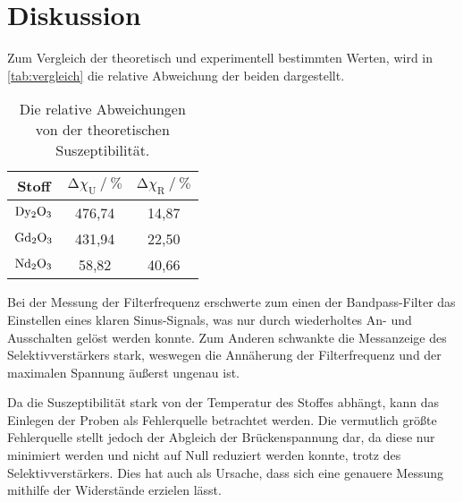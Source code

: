 \section{Diskussion}
\label{sec:Diskussion}

Zum Vergleich der theoretisch und experimentell bestimmten Werten, 
wird in \autoref{tab:vergleich} die relative Abweichung der beiden dargestellt.
\begin{table}
    \centering
    \caption{Die relative Abweichungen von der theoretischen Suszeptibilität.}
    \label{tab:vergleich}
    \begin{tabular}{c c c}
        \toprule
        Stoff &  
        $\increment \chi_\text{U} \mathbin{/} \%$ & 
        $\increment \chi_\text{R} \mathbin{/} \%$ \\
        \midrule
        $\ce{Dy2O3}$ &   476,74 &    14,87 \\
        $\ce{Gd2O3}$ &   431,94 &    22,50 \\
        $\ce{Nd2O3}$ &    58,82 &    40,66 \\
        \bottomrule
    \end{tabular}
\end{table}

Bei der Messung der Filterfrequenz erschwerte zum einen der Bandpass-Filter das Einstellen eines klaren Sinus-Signals, 
was nur durch wiederholtes An- und Ausschalten gelöst werden konnte.
Zum Anderen schwankte die Messanzeige des Selektivverstärkers stark, 
weswegen die Annäherung der Filterfrequenz und der maximalen Spannung äußerst ungenau ist.

Da die Suszeptibilität stark von der Temperatur des Stoffes abhängt, kann das Einlegen der Proben als Fehlerquelle betrachtet werden.
Die vermutlich größte Fehlerquelle stellt jedoch der Abgleich der Brückenspannung dar, 
da diese nur minimiert werden und nicht auf Null reduziert werden konnte, trotz des Selektivverstärkers. 
Dies hat auch als Ursache, dass sich eine genauere Messung mithilfe der Widerstände erzielen lässt.